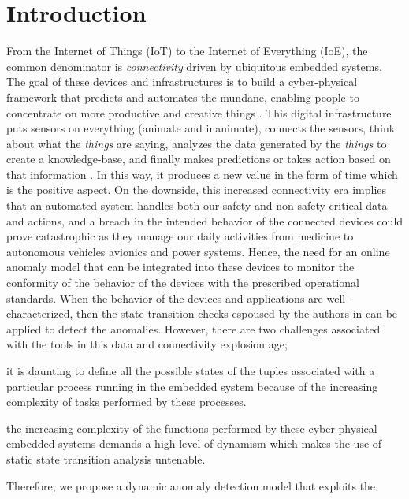 \section{Introduction}
\label{sec:introduction}
From the Internet of Things (IoT) to the Internet of Everything (IoE), the 
common denominator is \emph{connectivity} driven by ubiquitous embedded 
systems. The goal of these devices and infrastructures is to build a 
cyber-physical framework that predicts and automates the mundane, enabling 
people to concentrate on more productive and creative things 
\cite{weldon2016future}. This digital infrastructure puts sensors on everything 
(animate and inanimate), connects the sensors, think about what the 
\emph{things} are saying, analyzes the data generated by the \emph{things} to 
create a knowledge-base, and finally makes predictions or takes action based on 
that information \cite{ezeme2015multi}. In this way, it produces a new value in 
the form of time which is the positive aspect. On the downside, this increased 
connectivity era implies that an automated system handles both our safety and 
non-safety critical data and actions, and a breach in the intended behavior of 
the connected devices could prove catastrophic as they manage our daily 
activities from medicine to autonomous vehicles avionics and power systems. 
Hence, the need for an online anomaly model that can be integrated into these 
devices to monitor the conformity of the behavior of the devices with the 
prescribed operational standards. When the behavior of the devices and 
applications are well-characterized, then the state transition checks espoused 
by the authors in \cite{sumner2013comparative,li2017locating} can be applied to 
detect the anomalies. However, there are two challenges associated with the 
tools in this data and connectivity explosion age; 
\begin{enumerate*}[label={\alph*)},font={\bfseries}]
	\item it is daunting to define all the possible states of the tuples 
	associated with a particular process running in the embedded system because 
	of the increasing complexity of tasks performed by these processes.
	\item the increasing complexity of the functions \cite{ezeme2015multi} 
	performed by these cyber-physical embedded systems demands a high level of 
	dynamism which makes the use of static state transition analysis untenable.
\end{enumerate*}  
Therefore, we propose a dynamic anomaly detection model that exploits the 
